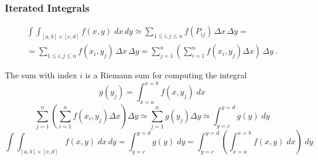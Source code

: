 \begin{frame}
  \frametitle{Iterated Integrals}
%
\begin{align*}
  \int\!\!\!\int_{[a,b] \times [c,d]} f(x,y) \; dx\, dy \simeq \sum_{1\leqslant i,j \leqslant n} f(P_{ij}) \, \Delta x \, \Delta y = \\
  = \sum_{1\leqslant i,j \leqslant n} f(x_i,y_j) \, \Delta x\, \Delta y = \sum_{j=1}^n \left( \sum_{i=1}^n f(x_i,y_j) \Delta x \right)\, \Delta y\; .
\end{align*}

\pause
The sum with index $i$ is a Riemann sum for computing the integral
%
$$g(y_j) = \int_{x=a}^{x=b} f(x,y_j) \; dx$$
%
\pause
$$\sum_{j=1}^n\left( \sum_{i=1}^n f(x_i,y_j) \Delta x \right) \Delta y \simeq \sum_{j=1}^n g(y_j) \Delta y \simeq \int_{y=c}^{y=d} g(y) \; dy$$
%
\pause
$$\int\!\!\!\int_{[a,b] \times [c,d]} f(x,y) \; dx\, dy = \int_{y=c}^{y=d} g(y) \; dy = \int_{y=c}^{y=d} \left( \int_{x=a}^{x=b} f(x,y) \; dx \right) \; dy$$
%
\end{frame}